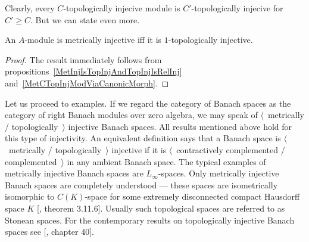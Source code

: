 Clearly, every $C$-topologically injecive module is $C'$-topologically 
injecive for $C'\geq C$. But we can state even more.

\begin{proposition}\label{MetInjIsOneTopInj} An $A$-module is metrically
injective iff it is $1$-topologically injective.
\end{proposition}
\begin{proof} The result immediately follows 
from propositions~\ref{MetInjIsTopInjAndTopInjIsRelInj} 
and~\ref{MetCTopInjModViaCanonicMorph}.
\end{proof}

Let us proceed to examples. If we regard the category of Banach spaces as the
category of right Banach modules over zero algebra, we may speak of
$\langle$~metrically / topologically~$\rangle$ injective Banach spaces. All
results mentioned above hold for this type of injectivity. An equivalent
definition says that a Banach space is $\langle$~metrically /
topologically~$\rangle$ injective if it is $\langle$~contractively complemented
/ complemented~$\rangle$ in any ambient Banach space. The typical examples of
metrically injective Banach spaces are $L_\infty$-spaces. Only metrically
injective Banach spaces are completely understood --- these spaces are
isometrically isomorphic to $C(K)$-space for some extremely disconnected compact
Hausdorff space $K$ [\cite{LaceyIsomThOfClassicBanSp}, theorem 3.11.6]. Usually
such topological spaces are referred to as Stonean spaces.  For the contemporary
results on topologically injective Banach spaces see
[\cite{JohnLinHandbookGeomBanSp}, chapter 40].

